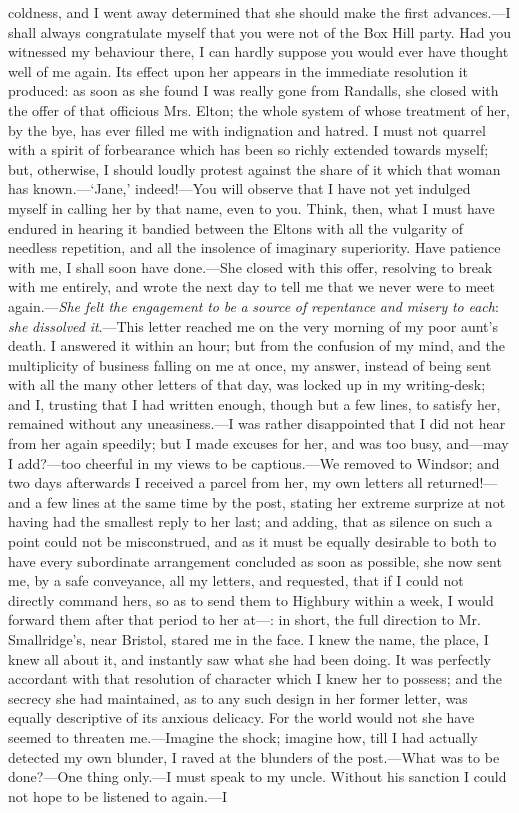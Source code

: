 coldness, and I went away determined that she should make the first advances.---I shall always congratulate myself that you were not of the Box Hill party. Had you witnessed my behaviour there, I can hardly suppose you would ever have thought well of me again. Its effect upon her appears in the immediate resolution it produced: as soon as she found I was really gone from Randalls, she closed with the offer of that officious Mrs. Elton; the whole system of whose treatment of her, by the bye, has ever filled me with indignation and hatred. I must not quarrel with a spirit of forbearance which has been so richly extended towards myself; but, otherwise, I should loudly protest against the share of it which that woman has known.---‘Jane,' indeed!---You will observe that I have not yet indulged myself in calling her by that name, even to you. Think, then, what I must have endured in hearing it bandied between the Eltons with all the vulgarity of needless repetition, and all the insolence of imaginary superiority. Have patience with me, I shall soon have done.---She closed with this offer, resolving to break with me entirely, and wrote the next day to tell me that we never were to meet again.---{\em She} {\em felt} {\em the} {\em engagement} {\em to} {\em be} {\em a} {\em source} {\em of} {\em repentance} {\em and} {\em misery} {\em to} {\em each}: {\em she} {\em dissolved} {\em it}.---This letter reached me on the very morning of my poor aunt's death. I answered it within an hour; but from the confusion of my mind, and the multiplicity of business falling on me at once, my answer, instead of being sent with all the many other letters of that day, was locked up in my writing-desk; and I, trusting that I had written enough, though but a few lines, to satisfy her, remained without any uneasiness.---I was rather disappointed that I did not hear from her again speedily; but I made excuses for her, and was too busy, and---may I add?---too cheerful in my views to be captious.---We removed to Windsor; and two days afterwards I received a parcel from her, my own letters all returned!---and a few lines at the same time by the post, stating her extreme surprize at not having had the smallest reply to her last; and adding, that as silence on such a point could not be misconstrued, and as it must be equally desirable to both to have every subordinate arrangement concluded as soon as possible, she now sent me, by a safe conveyance, all my letters, and requested, that if I could not directly command hers, so as to send them to Highbury within a week, I would forward them after that period to her at---: in short, the full direction to Mr. Smallridge's, near Bristol, stared me in the face. I knew the name, the place, I knew all about it, and instantly saw what she had been doing. It was perfectly accordant with that resolution of character which I knew her to possess; and the secrecy she had maintained, as to any such design in her former letter, was equally descriptive of its anxious delicacy. For the world would not she have seemed to threaten me.---Imagine the shock; imagine how, till I had actually detected my own blunder, I raved at the blunders of the post.---What was to be done?---One thing only.---I must speak to my uncle. Without his sanction I could not hope to be listened to again.---I 
